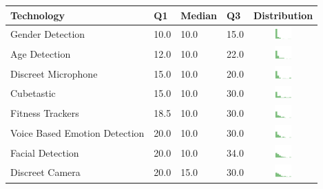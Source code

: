 \begin{table}[t]
\begin{center}
\small
\begin{tabular}{| p{2.6cm} | p{.8cm} | p{.8cm} | p{.8cm} | c |}
\hline
Technology & Q1 &  Median & Q3 & Distribution  \\ 
\hline
Gender Detection & 10.0 & 10.0 & 15.0 & \includegraphics[width = 2cm, height = 0.5cm]{tex-inputs/table-images/genderdetectionben} \\ 
Age Detection & 12.0 & 10.0 & 22.0 & \includegraphics[width = 2cm, height = 0.5cm]{tex-inputs/table-images/agedetectionben} \\ 
Discreet Microphone & 15.0 & 10.0 & 20.0 & \includegraphics[width = 2cm, height = 0.5cm]{tex-inputs/table-images/discreetmicrophoneben} \\ 
Cubetastic & 15.0 & 10.0 & 30.0 & \includegraphics[width = 2cm, height = 0.5cm]{tex-inputs/table-images/cubetasticben} \\ 
Fitness Trackers & 18.5 & 10.0 & 30.0 & \includegraphics[width = 2cm, height = 0.5cm]{tex-inputs/table-images/fitnesstrackersben} \\ 
Voice Based Emotion Detection & 20.0 & 10.0 & 30.0 & \includegraphics[width = 2cm, height = 0.5cm]{tex-inputs/table-images/voicebasedemotiondetectionben} \\ 
Facial Detection & 20.0 & 10.0 & 34.0 & \includegraphics[width = 2cm, height = 0.5cm]{tex-inputs/table-images/facialdetectionben} \\ 
Discreet Camera & 20.0 & 15.0 & 30.0 & \includegraphics[width = 2cm, height = 0.5cm]{tex-inputs/table-images/discreetvideocameraben} \\ 

\end{tabular}
\end{center}
\end{table}
